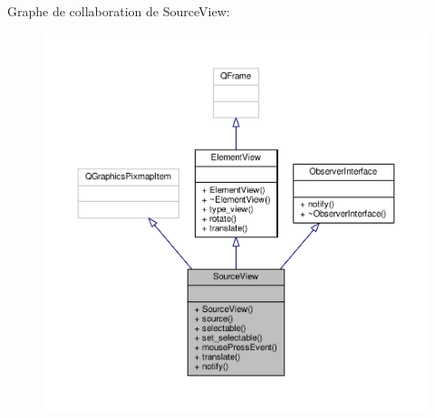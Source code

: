 Graphe de collaboration de Source\+View\+:\nopagebreak
\begin{figure}[H]
\begin{center}
\leavevmode
\includegraphics[width=350pt]{d2/df3/classSourceView__coll__graph}
\end{center}
\end{figure}

